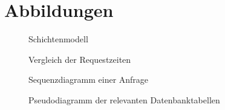 \chapter{Abbildungen}\label{ch:abbildungen}

	\begin{figure}[htp]
		\centering
		\caption{Schichtenmodell\label{fig:schichtenmodell}}
		\pgfplotsset{width=\textwidth}
		\fbox{
			
		}
	\end{figure}

	\begin{figure}[htp]
		\centering
		\caption{Vergleich der Requestzeiten\label{fig:timeOfRequests}}
		\pgfplotsset{width=\textwidth}
		\resizebox{\textwidth}{!}{
			
		}
	\end{figure}

	\begin{figure}[htp]
		\centering
		\caption{Sequenzdiagramm einer Anfrage\label{fig:appsequence}}
		\pgfplotsset{width=\textwidth}
		\fbox{
			
		}
	\end{figure}

	\begin{figure}[htp]
		\centering
		\caption{Pseudodiagramm der relevanten Datenbanktabellen \label{fig:lfiddatabase}}
		\pgfplotsset{width=\textwidth}
		\fbox{
			
		}
	\end{figure}

